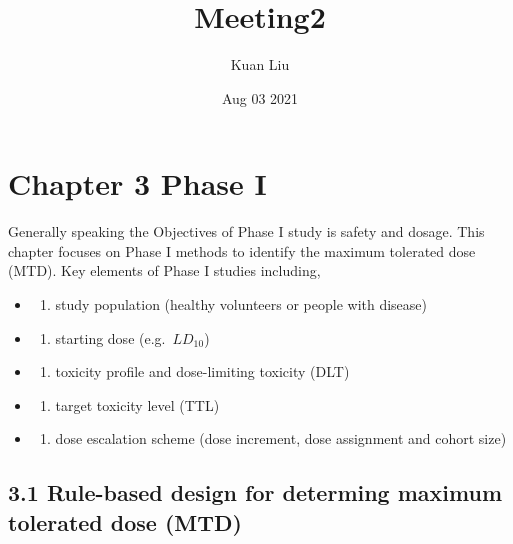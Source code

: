 \documentclass[
]{article}
\title{Meeting2}
\author{Kuan Liu}
\date{Aug 03 2021}
\providecommand{\tightlist}{%
  \setlength{\itemsep}{0pt}\setlength{\parskip}{0pt}}
\begin{document}
\maketitle

\hypertarget{chapter-3-phase-i}{%
\section{Chapter 3 Phase I}\label{chapter-3-phase-i}}

Generally speaking the Objectives of Phase I study is safety and dosage.
This chapter focuses on Phase I methods to identify the maximum
tolerated dose (MTD). Key elements of Phase I studies including,

\begin{itemize}
\item
  \begin{enumerate}
  \def\labelenumi{(\arabic{enumi})}
  \setcounter{enumi}{-1}
  \tightlist
  \item
    study population (healthy volunteers or people with disease)
  \end{enumerate}
\item
  \begin{enumerate}
  \def\labelenumi{(\alph{enumi})}
  \tightlist
  \item
    starting dose (e.g.~\(LD_{10}\))
  \end{enumerate}
\item
  \begin{enumerate}
  \def\labelenumi{(\alph{enumi})}
  \setcounter{enumi}{1}
  \tightlist
  \item
    toxicity profile and dose-limiting toxicity (DLT)
  \end{enumerate}
\item
  \begin{enumerate}
  \def\labelenumi{(\alph{enumi})}
  \setcounter{enumi}{2}
  \tightlist
  \item
    target toxicity level (TTL)
  \end{enumerate}
\item
  \begin{enumerate}
  \def\labelenumi{(\alph{enumi})}
  \setcounter{enumi}{3}
  \tightlist
  \item
    dose escalation scheme (dose increment, dose assignment and cohort
    size)
  \end{enumerate}
\end{itemize}

\hypertarget{rule-based-design-for-determing-maximum-tolerated-dose-mtd}{%
\subsection{3.1 Rule-based design for determing maximum tolerated dose
(MTD)}\label{rule-based-design-for-determing-maximum-tolerated-dose-mtd}}
\end{document}
